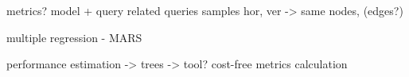 
metrics?
	model + query related
queries
samples
	hor, ver -> same nodes, (edges?)

multiple regression - MARS

performance estimation -> trees -> tool?
cost-free metrics calculation